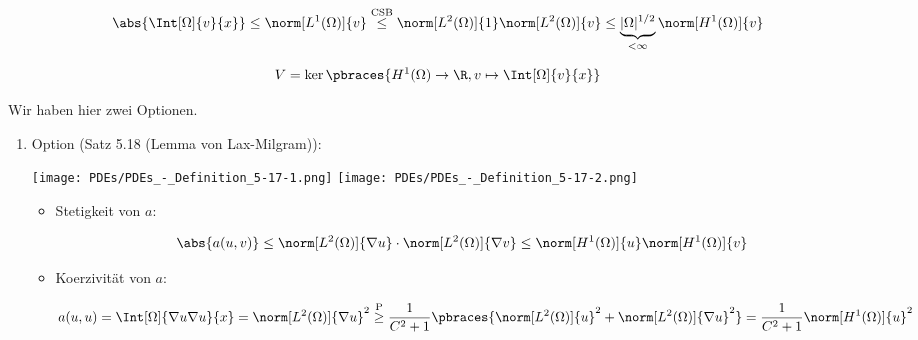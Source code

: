 \begin{solution}
\begin{enumerate}[label = \alph*)]
    \begin{align*}
        \abs{\Int[\Omega]{v}{x}}
        \leq
        \norm[L^1(\Omega)]{v}
        \stackrel
        {
            \mathrm{CSB}
        }{\leq}
        \norm[L^2(\Omega)]{1} \norm[L^2(\Omega)]{v}
        \leq
        \underbrace{|\Omega|^{1/2}}_{<\infty} \norm[H^1(\Omega)]{v}
    \end{align*}

    \begin{align*}
        V = \ker \pbraces{H^1(\Omega) \to \R, v \mapsto \Int[\Omega]{v}{x}}
    \end{align*}

    Wir haben hier zwei Optionen.

    \begin{enumerate}[label = \arabic*.]

        \item Option (Satz 5.18 (Lemma von Lax-Milgram)):

        \begin{center}
            \texttt{[image: PDEs/PDEs\_-\_Definition\_5-17-1.png]}
            \texttt{[image: PDEs/PDEs\_-\_Definition\_5-17-2.png]}
        \end{center}


        \begin{itemize}

            \item Stetigkeit von $a$:

            \begin{align*}
                \abs{a(u, v)}
                \leq
                \norm[L^2(\Omega)]{\nabla u} \cdot \norm[L^2(\Omega)]{\nabla v}
                \leq
                \norm[H^1(\Omega)]{u} \norm[H^1(\Omega)]{v}
            \end{align*}

            \item Koerzivität von $a$:

            \begin{align*}
                a(u, u)
                =
                \Int[\Omega]{\nabla u \nabla u}{x}
                =
                \norm[L^2(\Omega)]{\nabla u}^2
                \stackrel
                {
                    \mathrm{P}
                }{\geq}
                \frac{1}{C^2 + 1}
                \pbraces
                {
                   \norm[L^2(\Omega)]{u}^2 + \norm[L^2(\Omega)]{\nabla u}^2
                }
                =
                \frac{1}{C^2 + 1} \norm[H^1(\Omega)]{u}^2
            \end{align*}


\end{itemize}
\end{enumerate}
\end{enumerate}
\end{solution}

